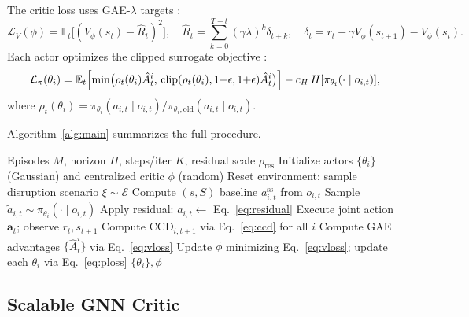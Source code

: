 \documentclass[11pt,a4paper]{article}
\theoremstyle{plain}
\theoremstyle{definition}
\newcommand{\E}{\mathbb{E}}
\newcommand{\N}{\mathcal{N}}
\newcommand{\CCD}{\mathrm{CCD}}
\begin{document}
The critic loss uses GAE-$\lambda$ targets \citep{schulman2016high}:
\begin{equation}
\mathcal{L}_V(\phi) = \E_t\bigl[(V_\phi(s_t)-\hat{R}_t)^2\bigr],\quad
\hat{R}_t = \sum_{k=0}^{T-t}(\gamma\lambda)^k\delta_{t+k},\quad
\delta_t = r_t + \gamma V_\phi(s_{t+1})-V_\phi(s_t).
\label{eq:vloss}
\end{equation}
Each actor optimizes the clipped surrogate objective \citep{schulman2017proximal}:
\begin{equation}
\mathcal{L}_\pi(\theta_i) =
  \E_t\Bigl[\min\bigl(\rho_t(\theta_i)\hat{A}^i_t,\,
  \operatorname{clip}(\rho_t(\theta_i),1{-}\epsilon,1{+}\epsilon)\hat{A}^i_t\bigr)\Bigr]
  - c_H\,H[\pi_{\theta_i}(\cdot\mid o_{i,t})],
\label{eq:ploss}
\end{equation}
where $\rho_t(\theta_i)=\pi_{\theta_i}(a_{i,t}\mid o_{i,t})/\pi_{\theta_i,\mathrm{old}}(a_{i,t}\mid o_{i,t})$.

Algorithm~\ref{alg:main} summarizes the full procedure.

\begin{algorithm}[t]
\caption{CCD-MAPPO with $(s,S)$ Residual Policy}
\label{alg:main}
\begin{algorithmic}[1]
\Require Episodes $M$, horizon $H$, steps/iter $K$, residual scale $\rho_{\mathrm{res}}$
\State Initialize actors $\{\theta_i\}$ (Gaussian) and centralized critic $\phi$ (random)
  \State Reset environment; sample disruption scenario $\xi\sim\mathcal{E}$
    \For{each agent $i\in\N$}
      \State Compute $(s,S)$ baseline $a^{\mathrm{ss}}_{i,t}$ from $o_{i,t}$
      \State Sample $\tilde{a}_{i,t}\sim\pi_{\theta_i}(\cdot\mid o_{i,t})$
      \State Apply residual: $a_{i,t}\leftarrow$ Eq.~\eqref{eq:residual}
    \EndFor
    \State Execute joint action $\mathbf{a}_t$; observe $r_t,s_{t+1}$
    \State Compute $\CCD_{i,t+1}$ via Eq.~\eqref{eq:ccd} for all $i$
  \EndFor
  \State Compute GAE advantages $\{\hat{A}^i_t\}$ via Eq.~\eqref{eq:vloss}
  \State Update $\phi$ minimizing Eq.~\eqref{eq:vloss}; update each $\theta_i$ via Eq.~\eqref{eq:ploss}
\EndFor
\State \Return $\{\theta_i\},\phi$
\end{algorithmic}
\end{algorithm}

\subsection{Scalable GNN Critic}
\label{sec:gnn}
\end{document}
